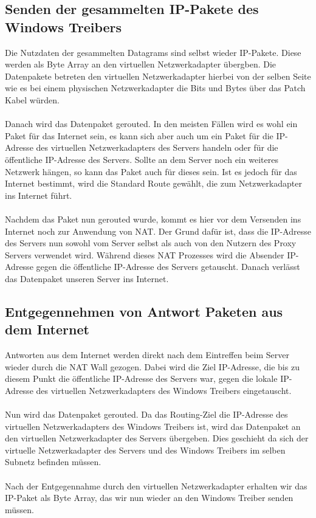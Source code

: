\subsection{Senden der gesammelten IP-Pakete des Windows Treibers}
Die Nutzdaten der gesammelten Datagrams sind selbst wieder IP-Pakete. Diese werden als Byte Array an den virtuellen Netzwerkadapter übergben. Die Datenpakete betreten den virtuellen Netzwerkadapter hierbei von der selben Seite wie es bei einem physischen Netzwerkadapter die Bits und Bytes über das Patch Kabel würden.
\\\\  
Danach wird das Datenpaket gerouted. In den meisten Fällen wird es wohl ein Paket für das Internet sein, es kann sich aber auch um ein Paket für die IP-Adresse des virtuellen Netzwerkadapters des Servers handeln oder für die öffentliche IP-Adresse des Servers. Sollte an dem Server noch ein weiteres Netzwerk hängen, so kann das Paket auch für dieses sein. Ist es jedoch für das Internet bestimmt, wird die Standard Route gewählt, die zum Netzwerkadapter ins Internet führt. 
\\\\
Nachdem das Paket nun gerouted wurde, kommt es hier vor dem Versenden ins Internet noch zur Anwendung von NAT. Der Grund dafür ist, dass die IP-Adresse des Servers nun sowohl vom Server selbst als auch von den Nutzern des Proxy Servers verwendet wird. Während dieses NAT Prozesses wird die Absender IP-Adresse gegen die öffentliche IP-Adresse des Servers getauscht. Danach verlässt das Datenpaket unseren Server ins Internet.

\subsection{Entgegennehmen von Antwort Paketen aus dem Internet}
Antworten aus dem Internet werden direkt nach dem Eintreffen beim Server wieder durch die NAT Wall gezogen. Dabei wird die Ziel IP-Adresse, die bis zu diesem Punkt die öffentliche IP-Adresse des Servers war, gegen die lokale IP-Adresse des virtuellen Netzwerkadapters des Windows Treibers eingetauscht.
\\\\ 
Nun wird das Datenpaket gerouted. Da das Routing-Ziel die IP-Adresse des   virtuellen Netzwerkadapters des Windows Treibers ist, wird das Datenpaket an den virtuellen Netzwerkadapter des Servers übergeben. Dies geschieht da sich der virtuelle Netzwerkadapter des Servers und des Windows Treibers im selben Subnetz befinden müssen.  
\\\\
Nach der Entgegennahme durch den virtuellen Netzwerkadapter erhalten wir das IP-Paket als Byte Array, das wir nun wieder an den Windows Treiber senden müssen.


